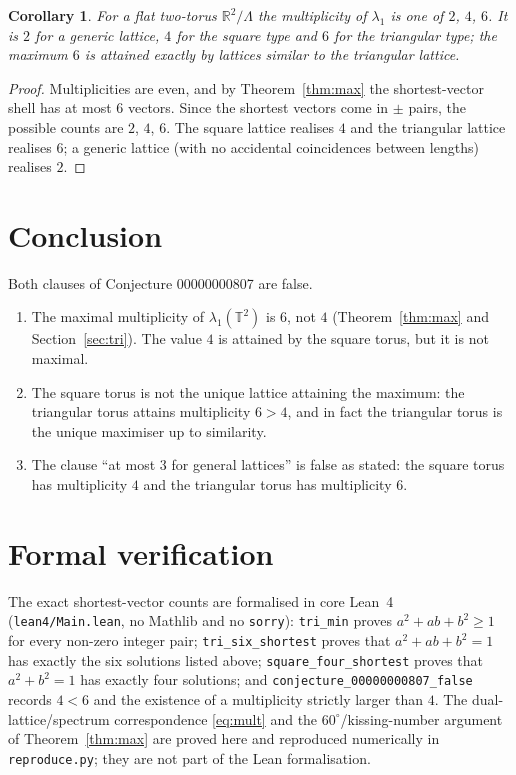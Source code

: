 \documentclass[11pt]{article}
\newtheorem{corollary}[theorem]{Corollary}
\theoremstyle{definition}
\newcommand{\R}{\mathbb{R}}
\newcommand{\T}{\mathbb{T}}
\newcommand{\Lam}{\Lambda}
\begin{document}
\begin{corollary}
For a flat two-torus $\R^2/\Lam$ the multiplicity of $\lambda_1$ is one of
$2$, $4$, $6$.  It is $2$ for a generic lattice, $4$ for the square type
and $6$ for the triangular type; the maximum $6$ is attained exactly by
lattices similar to the triangular lattice.
\end{corollary}

\begin{proof}
Multiplicities are even, and by Theorem~\ref{thm:max} the shortest-vector
shell has at most $6$ vectors.  Since the shortest vectors come in $\pm$
pairs, the possible counts are $2$, $4$, $6$.  The square lattice realises
$4$ and the triangular lattice realises $6$; a generic lattice (with no
accidental coincidences between lengths) realises $2$.
\end{proof}

\section{Conclusion}

Both clauses of Conjecture 00000000807 are false.
\begin{enumerate}
  \item The maximal multiplicity of $\lambda_1(\T^2)$ is $6$, not $4$
        (Theorem~\ref{thm:max} and Section~\ref{sec:tri}).  The value $4$ is
        attained by the square torus, but it is not maximal.
  \item The square torus is not the unique lattice attaining the maximum:
        the triangular torus attains multiplicity $6 > 4$, and in fact the
        triangular torus is the unique maximiser up to similarity.
  \item The clause ``at most $3$ for general lattices'' is false as stated:
        the square torus has multiplicity $4$ and the triangular torus has
        multiplicity $6$.
\end{enumerate}

\section{Formal verification}

The exact shortest-vector counts are formalised in core Lean~4
(\texttt{lean4/Main.lean}, no Mathlib and no \texttt{sorry}):
\texttt{tri\_min} proves $a^2 + ab + b^2 \ge 1$ for every non-zero integer
pair; \texttt{tri\_six\_shortest} proves that $a^2 + ab + b^2 = 1$ has exactly
the six solutions listed above; \texttt{square\_four\_shortest} proves that
$a^2 + b^2 = 1$ has exactly four solutions; and
\texttt{conjecture\_00000000807\_false} records $4 < 6$ and the existence of a
multiplicity strictly larger than $4$.  The dual-lattice/spectrum
correspondence \eqref{eq:mult} and the $60^\circ$/kissing-number argument of
Theorem~\ref{thm:max} are proved here and reproduced numerically in
\texttt{reproduce.py}; they are not part of the Lean formalisation.
\end{document}
